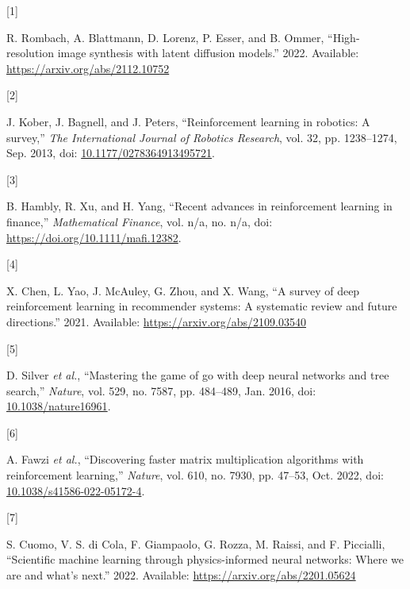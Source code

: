 \documentclass[
  letterpaper,
]{report}
\newlength{\cslhangindent}
\newlength{\csllabelwidth}
\newlength{\cslentryspacingunit} %
\newenvironment{CSLReferences}[2] %
 {%
  \setlength{\parindent}{0pt}
  \ifodd #1
  \let\oldpar\par
  \def\par{\hangindent=\cslhangindent\oldpar}
  \fi
  \setlength{\parskip}{#2\cslentryspacingunit}
 }%
 {}
\newcommand{\CSLLeftMargin}[1]{\parbox[t]{\csllabelwidth}{#1}}
\newcommand{\CSLRightInline}[1]{\parbox[t]{\linewidth - \csllabelwidth}{#1}\break}
\theoremstyle{plain}
\theoremstyle{definition}
\theoremstyle{definition}
\theoremstyle{remark}
\begin{document}
\hypertarget{refs}{}
\begin{CSLReferences}{0}{0}
\leavevmode{}%
\CSLLeftMargin{{[}1{]} }%
\CSLRightInline{R. Rombach, A. Blattmann, D. Lorenz, P. Esser, and B.
Ommer, {``High-resolution image synthesis with latent diffusion
models.''} 2022. Available: \url{https://arxiv.org/abs/2112.10752}}

\leavevmode{}%
\CSLLeftMargin{{[}2{]} }%
\CSLRightInline{J. Kober, J. Bagnell, and J. Peters, {``Reinforcement
learning in robotics: A survey,''} \emph{The International Journal of
Robotics Research}, vol. 32, pp. 1238--1274, Sep. 2013, doi:
\href{https://doi.org/10.1177/0278364913495721}{10.1177/0278364913495721}.}

\leavevmode{}%
\CSLLeftMargin{{[}3{]} }%
\CSLRightInline{B. Hambly, R. Xu, and H. Yang, {``Recent advances in
reinforcement learning in finance,''} \emph{Mathematical Finance}, vol.
n/a, no. n/a, doi: \url{https://doi.org/10.1111/mafi.12382}.}

\leavevmode{}%
\CSLLeftMargin{{[}4{]} }%
\CSLRightInline{X. Chen, L. Yao, J. McAuley, G. Zhou, and X. Wang, {``A
survey of deep reinforcement learning in recommender systems: A
systematic review and future directions.''} 2021. Available:
\url{https://arxiv.org/abs/2109.03540}}

\leavevmode{}%
\CSLLeftMargin{{[}5{]} }%
\CSLRightInline{D. Silver \emph{et al.}, {``Mastering the game of go
with deep neural networks and tree search,''} \emph{Nature}, vol. 529,
no. 7587, pp. 484--489, Jan. 2016, doi:
\href{https://doi.org/10.1038/nature16961}{10.1038/nature16961}.}

\leavevmode{}%
\CSLLeftMargin{{[}6{]} }%
\CSLRightInline{A. Fawzi \emph{et al.}, {``Discovering faster matrix
multiplication algorithms with reinforcement learning,''} \emph{Nature},
vol. 610, no. 7930, pp. 47--53, Oct. 2022, doi:
\href{https://doi.org/10.1038/s41586-022-05172-4}{10.1038/s41586-022-05172-4}.}

\leavevmode{}%
\CSLLeftMargin{{[}7{]} }%
\CSLRightInline{S. Cuomo, V. S. di Cola, F. Giampaolo, G. Rozza, M.
Raissi, and F. Piccialli, {``Scientific machine learning through
physics-informed neural networks: Where we are and what's next.''} 2022.
Available: \url{https://arxiv.org/abs/2201.05624}}


\end{CSLReferences}
\end{document}
